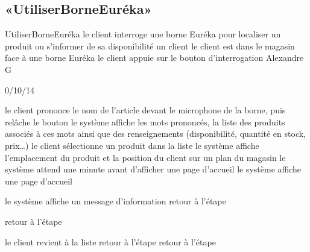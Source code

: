 \subsection{«UtiliserBorneEuréka»}

\startCU
\nom UtiliserBorneEuréka
\but le client interroge une borne Euréka pour localiser un produit ou s’informer de sa disponibilité
\acteur un client
\precondition le client est dans le magasin face à une borne Euréka
\declenchement le client appuie sur le bouton d'interrogation
\auteur Alexandre G
\date 30/10/14

\nominal %
\startnominal
{} le client prononce le nom de l'article devant le microphone de la borne, puis relâche le bouton
 le système affiche les mots prononcés, la liste des produits associés à ces mots ainsi que des renseignements (disponibilité, quantité en stock, prix\dots) 
 le client sélectionne un produit dans la liste
\etape le système affiche l'emplacement du produit et la position du client sur un plan du magasin
 le système attend une minute avant d'afficher une page d'accueil
\stopnominal
\postcondition le système affiche une page d'accueil

\alternatifs 

  \etape le système affiche un message d'information
  \etape retour à l'étape 
\stopcondition
\stopalternatif

\etape retour à l'étape 
\stopcondition
\stopalternatif

  \etape le client revient à la liste 
  \etape retour à l'étape 
\stopcondition
{}
  \etape retour à l'étape 
\stopcondition
\stopalternatif

\stopCU
